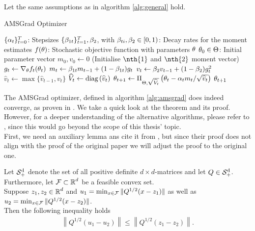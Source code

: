 \begin{algorithm}[H]
Let the same assumptions as in algorithm \ref{alg:general} hold.
\caption{AMSGrad Optimizer}\label{alg:amsgrad}
\begin{algorithmic}[1]
\Require $\{\alpha_t\}_{t=0}^T$: Stepsizes
\Require $\{\beta_{1t}\}_{t=1}^T, \beta_2$, with $\beta_{ti},\beta_2\in [0,1)$: Decay rates for the moment estimates
\Require $f(\theta)$: Stochastic objective function with parameters $\theta$
\Require $\theta_0\in\operatorname{\Theta}$: Initial parameter vector
\State $m_0,v_0 \gets 0$ (Initialise $\nth{1}$ and $\nth{2}$ moment vector)
	\State $g_t \gets \nabla_{\theta}f_t(\theta_{t})$ 
	\State $m_t \gets \beta_{1t}m_{t-1} + (1-\beta_{1t})g_t$ 
	\State $v_t \gets \beta_{2}v_{t-1} + (1-\beta_{2})g_t^2$ 
	\State $\hat{v}_{t} \gets \max\{\hat{v}_{t-1}, v_t\}$ 
	\State $\widehat{V}_{t} \gets \operatorname{\text{diag}}\left(\widehat{v}_{t}\right)$ 
	\State $\theta_{t+1} \gets \Pi_{\operatorname{\Theta},\sqrt{\widehat{V}_t}}\left(\theta_{t} - \alpha_tm_t/\sqrt{\widehat{v}_t}\right)$ 
\EndFor
\State \Return $\theta_{t+1}$ 
\end{algorithmic}
\end{algorithm}

The AMSGrad optimizer, defined in algorithm \ref{alg:amsgrad} does indeed converge, as proven in \cite[theorem~4]{reddi2019convergence}. We take a quick look at the theorem and its proof. However, for a deeper understanding of the alternative algorithms, please refer to  \cite{reddi2019convergence}, since this would go beyond the scope of this thesis' topic.\\
First, we need an auxiliary lemma ans cite it from \cite[lemma~4]{reddi2019convergence}, but since their proof does not align with the proof of the original paper \cite[lemma~3]{mcmahan2010adaptive} we will adjust the proof to the original one.

\begin{lemma}\label{lemma:McMahan_Streeter}
Let $\operatorname{\mathcal{S}^d_{+}}$ denote the set of all positive definite $d\times d$-matrices and let $Q\in \operatorname{\mathcal{S}^d_{+}}$. Furthermore, let $\operatorname{\mathcal{F}}\subset \operatorname{\mathbb{R}}^d$ be a feasible convex set.\\
Suppose $z_1,z_2 \in\operatorname{\mathbb{R}}^d$ and $u_1 = \min_{x\in\operatorname{\mathcal{F}}} \|Q^{1/2}(x-z_1)\|$ as well as $u_2 = \min_{x\in\operatorname{\mathcal{F}}} \|Q^{1/2}(x-z_2)\|$.\\
Then the following inequality holds
\begin{align*}
\left\| Q^{1/2} \left( u_1 - u_2 \right) \right\| \leq \left\| Q^{1/2} \left( z_1 - z_2 \right) \right\|.
\end{align*}
\end{lemma}

